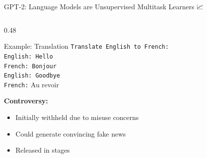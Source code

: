 \documentclass[aspectratio=169]{beamer}
\begin{document}
\begin{frame}{GPT-2: Language Models are Unsupervised Multitask Learners 📈}
\begin{columns}[T]
\begin{column}{0.48\textwidth}
\vspace{0.5em}

\begin{exampleblock}{Example: Translation}
\scriptsize
\texttt{Translate English to French:\\
English: Hello\\
French: Bonjour\\
English: Goodbye\\
French:} \alert{Au revoir}
\end{exampleblock}

\vspace{0.5em}

\textbf{Controversy:}
\begin{itemize}
    \item Initially withheld due to misuse concerns
    \item Could generate convincing fake news
    \item Released in stages
\end{itemize}
\end{column}
\end{columns}
\end{frame}
\end{document}

